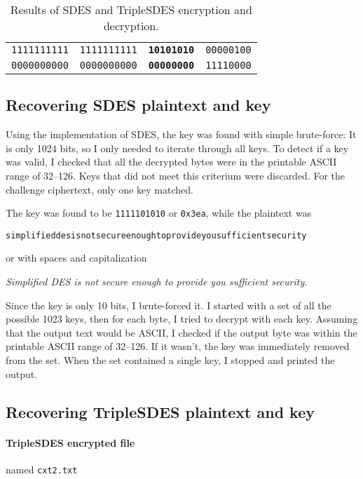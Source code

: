 \documentclass[a4paper,english,12pt]{article}
\begin{document}
\begin{table}
\begin{tabular}{@{}llll@{}}
            \texttt{1111111111} &
            \texttt{1111111111} &
      \texttt{\textbf{10101010}} &
              \texttt{00000100} \\

            \texttt{0000000000} &
            \texttt{0000000000} &
      \texttt{\textbf{00000000}} &
              \texttt{11110000} \\
    \bottomrule
  \end{tabular}
  \caption{Results of SDES and TripleSDES encryption and decryption.}
  \label{table:sdes}
\end{table}

\subsection{Recovering SDES plaintext and key}

Using the implementation of SDES, the key was found with simple brute-force: It
is only 1024 bits, so I only needed to iterate through all keys. To detect if a
key was valid, I checked that all the decrypted bytes were in the printable ASCII
range of 32--126. Keys that did not meet this criterium were discarded. For the
challenge ciphertext, only one key matched.

The key was found to be \texttt{1111101010} or \texttt{0x3ea}, while the
plaintext was
\begin{verbatim}
simplifieddesisnotsecureenoughtoprovideyousufficientsecurity
\end{verbatim}
or with spaces and capitalization
\begin{center}
\textit{Simplified DES is not secure enough to provide you sufficient security.}
\end{center}

Since the key is only 10 bits, I brute-forced it. I started with a set of all
the possible 1023 keys, then for each byte, I tried to decrypt with each key.
Assuming that the output text would be ASCII, I checked if the output byte was
within the printable ASCII range of 32--126. If it wasn't, the key was
immediately removed from the set. When the set contained a single key, I
stopped and printed the output.

\subsection{Recovering TripleSDES plaintext and key}

\paragraph{TripleSDES encrypted file} named \texttt{cxt2.txt}
\end{document}
